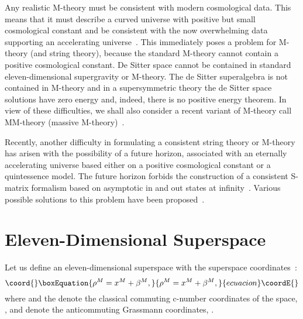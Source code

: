 \documentclass[a4paper,12pt]{article}
\begin{document}
Any realistic M-theory must be consistent with modern cosmological data.
This means that it must describe a curved universe with positive but small
cosmological constant and be consistent with the now overwhelming data
supporting an accelerating universe~\cite{Perlmutter}. This immediately
poses a problem for M-theory (and string theory), because the standard
M-theory cannot contain a positive cosmological constant. De Sitter space
cannot be contained in standard eleven-dimensional supergravity or
M-theory. The de Sitter superalgebra is not contained in M-theory and in a
supersymmetric theory the de Sitter space solutions have zero energy and,
indeed, there is no positive energy theorem. In view of these difficulties,
we shall also consider a recent variant of M-theory call MM-theory (massive
M-theory)~\cite{Lambert}.

Recently, another difficulty in formulating a consistent string theory or
M-theory has arisen with the possibility of a future horizon, associated
with an eternally accelerating universe based either on a positive
cosmological constant or a quintessence model. The future horizon forbids
the construction of a consistent S-matrix formalism based on asymptotic in
and out states at infinity~\cite{Susskind,Witten}.
Various possible solutions to this problem have been
proposed~\cite{Moffat4,Cline}.

\section{\bf Eleven-Dimensional Superspace}

Let us define an eleven-dimensional superspace with the superspace
coordinates~\cite{Moffat}:
\begin{equation}\coord{}\boxEquation{
\rho^M=x^M+\beta^M,
}{
\rho^M=x^M+\beta^M,
}{ecuacion}\coordE{}\end{equation}
where \coordHE{} and the \coordHE{} denote the classical commuting
c-number coordinates of the space, \coordHE{}, and \coordHE{} denote
the anticommuting Grassmann coordinates, \coordHE{}.
\end{document}
